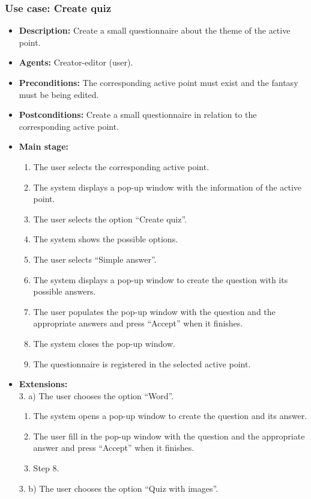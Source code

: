 \subsubsection{Use case: Create quiz}
\begin{itemize}
	\item \textbf{Description:} Create a small questionnaire about the theme of the active point.
	\item \textbf{Agents:} Creator-editor (user).
	\item \textbf{Preconditions:} The corresponding active point must exist and the fantasy must be being edited.
	\item \textbf{Postconditions:} Create a small questionnaire in relation to the corresponding active point.
	\item \textbf{Main stage:}
	\begin{enumerate}
		\item The user selects the corresponding active point.
		\item The system displays a pop-up window with the information of the active point.
		\item The user selects the option ``Create quiz''.
		\item The system shows the possible options.
		\item The user selects ``Simple answer''.
		\item The system displays a pop-up window to create the question with its possible answers.
		\item The user populates the pop-up window with the question and the appropriate answers and press ``Accept'' when it finishes.
		\item The system closes the pop-up window.
		\item The questionnaire is registered in the selected active point.
	\end{enumerate}
	\item \textbf{Extensions:} \\3. a) The user chooses the option ``Word''.
	\begin{enumerate}
		\item The system opens a pop-up window to create the question and its answer.
		\item The user fill in the pop-up window with the question and the appropriate answer and press ``Accept'' when it finishes.
		\item Step 8.
	\end{enumerate}
	3. b) The user chooses the option ``Quiz with images''. %

\end{itemize}
